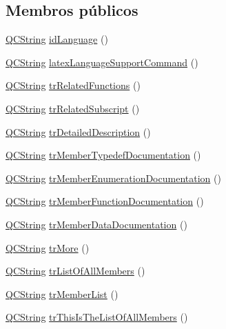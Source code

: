 \subsection*{Membros públicos}
\begin{DoxyCompactItemize}
\item 
\hyperlink{class_q_c_string}{Q\-C\-String} \hyperlink{class_translator_polish_a7de89df4aaf34700ff3db1d056a4f267}{id\-Language} ()
\item 
\hyperlink{class_q_c_string}{Q\-C\-String} \hyperlink{class_translator_polish_a0348bf1d3055ce6a48cf5f68f6fce2c1}{latex\-Language\-Support\-Command} ()
\item 
\hyperlink{class_q_c_string}{Q\-C\-String} \hyperlink{class_translator_polish_a577fc586e534023ef1529208518a994e}{tr\-Related\-Functions} ()
\item 
\hyperlink{class_q_c_string}{Q\-C\-String} \hyperlink{class_translator_polish_ab75e972b3134554de11b07bd64127b78}{tr\-Related\-Subscript} ()
\item 
\hyperlink{class_q_c_string}{Q\-C\-String} \hyperlink{class_translator_polish_abbd0ae4fd49dd1e88f99e03dd19d4e35}{tr\-Detailed\-Description} ()
\item 
\hyperlink{class_q_c_string}{Q\-C\-String} \hyperlink{class_translator_polish_a95ba3c5f2554643a7dc0f3408c2b493d}{tr\-Member\-Typedef\-Documentation} ()
\item 
\hyperlink{class_q_c_string}{Q\-C\-String} \hyperlink{class_translator_polish_acfa422f286e43d1d5c893475aca1e757}{tr\-Member\-Enumeration\-Documentation} ()
\item 
\hyperlink{class_q_c_string}{Q\-C\-String} \hyperlink{class_translator_polish_aea34608536223538051d2155ff75e05e}{tr\-Member\-Function\-Documentation} ()
\item 
\hyperlink{class_q_c_string}{Q\-C\-String} \hyperlink{class_translator_polish_abf6ac59353bc6c466642f7c1919fc3f2}{tr\-Member\-Data\-Documentation} ()
\item 
\hyperlink{class_q_c_string}{Q\-C\-String} \hyperlink{class_translator_polish_a2487804cd36e9995aaadb94275b58fd7}{tr\-More} ()
\item 
\hyperlink{class_q_c_string}{Q\-C\-String} \hyperlink{class_translator_polish_aa4f141f325a7ec448304389833d483d1}{tr\-List\-Of\-All\-Members} ()
\item 
\hyperlink{class_q_c_string}{Q\-C\-String} \hyperlink{class_translator_polish_a26d915bcb2e7e1e206bc6a18f05a7c66}{tr\-Member\-List} ()
\item 
\hyperlink{class_q_c_string}{Q\-C\-String} \hyperlink{class_translator_polish_aa4890a86c6f0232638bedf799b9cd600}{tr\-This\-Is\-The\-List\-Of\-All\-Members} ()

\end{DoxyCompactItemize}
